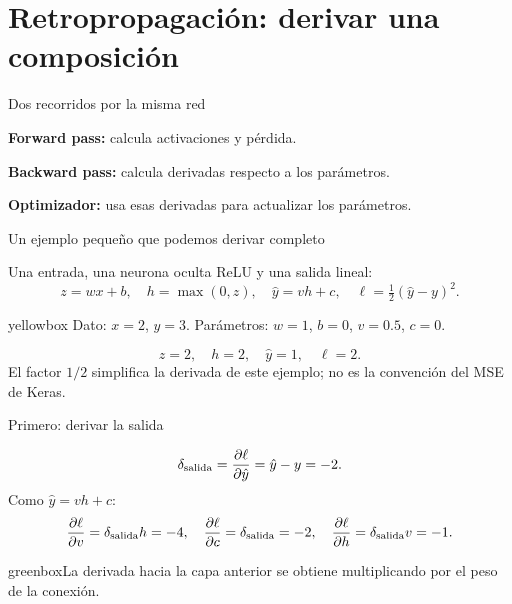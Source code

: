 \documentclass[10pt,aspectratio=169,xcolor={dvipsnames}]{beamer}
\newenvironment{caja}[1][lgraybox]{\begin{beamercolorbox}[sep=0.7em,wd=\linewidth]{#1}}{\end{beamercolorbox}}
\begin{document}
\section{Retropropagación: derivar una composición}
\begin{frame}{Dos recorridos por la misma red}
\centering
{}\par\bigskip\raggedright
\textbf{Forward pass:} calcula activaciones y pérdida.\par\medskip
\textbf{Backward pass:} calcula derivadas respecto a los parámetros.
\par\medskip\textbf{Optimizador:} usa esas derivadas para actualizar los parámetros.
\note{}
\end{frame}

\begin{frame}{Un ejemplo pequeño que podemos derivar completo}

Una entrada, una neurona oculta ReLU y una salida lineal:
\[z=wx+b,\quad h=\max(0,z),\quad\hat y=vh+c,
\quad\ell=\tfrac12(\hat y-y)^2.\]
\begin{caja}[yellowbox]
Dato: $x=2$, $y=3$. Parámetros: $w=1$, $b=0$, $v=0.5$, $c=0$.
\end{caja}
\[z=2,\quad h=2,\quad\hat y=1,\quad\ell=2.\]
El factor $1/2$ simplifica la derivada de este ejemplo; no es la convención del MSE de Keras.
\note{}
\end{frame}

\begin{frame}{Primero: derivar la salida}

\[\delta_{\rm salida}=\frac{\partial\ell}{\partial\hat y}=\hat y-y=-2.\]
Como $\hat y=vh+c$:
\[\frac{\partial\ell}{\partial v}=\delta_{\rm salida}h=-4,
\quad\frac{\partial\ell}{\partial c}=\delta_{\rm salida}=-2,
\quad\frac{\partial\ell}{\partial h}=\delta_{\rm salida}v=-1.\]
\begin{caja}[greenbox]La derivada hacia la capa anterior se obtiene multiplicando por el peso de la conexión.\end{caja}
\note{}
\end{frame}
\end{document}
